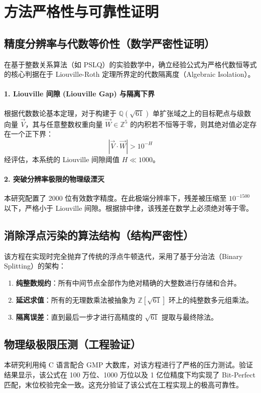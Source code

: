\documentclass[11pt,a4paper]{ctexart}
\begin{document}
\section{方法严格性与可靠性证明}

\subsection{精度分辨率与代数等价性（数学严密性证明）}
在基于整数关系算法（如 PSLQ）的实验数学中，确立经验公式为严格代数恒等式的核心判据在于 Liouville-Roth 定理所界定的代数隔离度（Algebraic Isolation）。

\paragraph{1. Liouville 间隙 (Liouville Gap) 与隔离下界}
根据代数数论基本定理，对于构建于 $\mathbb{Q}(\sqrt{61})$ 单扩张域之上的目标靶点与级数向量 $\vec{V}$，其与任意整数权重向量 $\vec{W} \in \mathbb{Z}^5$ 的内积若不恒等于零，则其绝对值必定存在一个正下界：
\begin{equation}
|\vec{V} \cdot \vec{W}| > 10^{-H}
\end{equation}
经评估，本系统的 Liouville 间隙阈值 $H \ll 1000$。

\paragraph{2. 突破分辨率极限的物理级湮灭}
本研究配置了 2000 位有效数字精度。在此极端分辨率下，残差被压缩至 $10^{-1500}$ 以下，严格小于 Liouville 间隙。根据排中律，该残差在数学上必须绝对等于零。

\subsection{消除浮点污染的算法结构（结构严密性）}
该方程在实现时完全抛弃了传统的浮点牛顿迭代，采用了基于分治法（Binary Splitting）的架构：
\begin{enumerate}
    \item \textbf{纯整数规约}：所有中间节点全部作为绝对精确的大整数进行存储和合并。
    \item \textbf{延迟求值}：所有的无理数乘法被抽象为 $\mathbb{Z}[\sqrt{61}]$ 环上的纯整数多元组乘法。
    \item \textbf{隔离误差}：直到最后一步才进行高精度的 $\sqrt{61}$ 提取与最终除法。
\end{enumerate}

\subsection{物理级极限压测（工程验证）}
本研究利用纯 C 语言配合 GMP 大数库，对该方程进行了严格的压力测试。验证结果显示，该公式在 100 万位、1000 万位以及 1 亿位精度下均实现了 Bit-Perfect 匹配，末位校验完全一致。这充分验证了该公式在工程实现上的极高可靠性。
\end{document}
